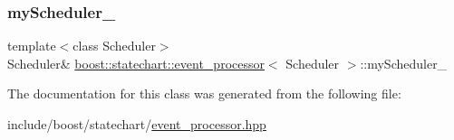 \mbox{\label{classboost_1_1statechart_1_1event__processor_ac79038b02ceb3fe8acef2a5ce62d4c02}} 
\subsubsection{\texorpdfstring{my\+Scheduler\+\_\+}{myScheduler\_}}
{\footnotesize\ttfamily template$<$class Scheduler$>$ \\
Scheduler\& \mbox{\hyperlink{classboost_1_1statechart_1_1event__processor}{boost\+::statechart\+::event\+\_\+processor}}$<$ Scheduler $>$\+::my\+Scheduler\+\_\+\hspace{0.3cm}{\ttfamily [private]}}



The documentation for this class was generated from the following file\+:\begin{DoxyCompactItemize}
\item 
include/boost/statechart/\mbox{\hyperlink{event__processor_8hpp}{event\+\_\+processor.\+hpp}}\end{DoxyCompactItemize}
